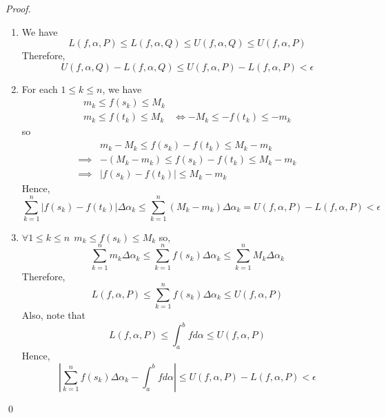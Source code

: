 \begin{proof}
    \begin{enumerate}[($i$)]
        \item We have 
        $$L(f, \alpha, P) \leq L(f, \alpha, Q) \leq U(f, \alpha, Q) \leq U(f, \alpha, P)$$
        Therefore,
        $$U(f, \alpha, Q) - L(f, \alpha, Q) \leq U(f, \alpha, P) - L(f, \alpha, P) < \epsilon$$
        \item For each $1 \leq k \leq n$, we have 
        \begin{align*}
            m_k \leq f(s_k) \leq M_k & \\
            m_k \leq f(t_k) \leq M_k &\iff -M_k \leq -f(t_k) \leq -m_k
        \end{align*}
        so
        \begin{align*}
            &m_k - M_k \leq f(s_k) - f(t_k) \leq M_k - m_k \\
            \implies &-(M_k - m_k) \leq f(s_k) - f(t_k) \leq M_k - m_k \\
            \implies &\left|f(s_k)-f(t_k)\right| \leq M_k - m_k
        \end{align*}
        Hence,
        $$\sum_{k=1}^{n}\left|f(s_k)-f(t_k)\right|\Delta \alpha_k \leq \sum_{k=1}^{n}\left(M_k - m_k\right) \Delta \alpha_k = U(f, \alpha, P) - L(f, \alpha, P) < \epsilon$$

        \item $\forall 1 \leq k \leq n ~~m_k \leq f(s_k) \leq M_k$ so,
        $$\sum_{k=1}^{n}m_k \Delta \alpha_k \leq \sum_{k=1}^{n}f(s_k) \Delta \alpha_k \leq \sum_{k=1}^{n} M_k \Delta \alpha_k$$
        Therefore,
        \begin{equation*}
            L(f, \alpha, P) \leq \sum_{k=1}^{n} f(s_k) \Delta \alpha_k \leq U(f, \alpha, P)
        \end{equation*}
        Also, note that
        \begin{equation*}
            L(f, \alpha, P) \leq \int_{a}^{b}f d\alpha \leq U(f, \alpha, P)
        \end{equation*}
        Hence,
        $$\left|\sum_{k=1}^{n}f(s_k)\Delta \alpha_k - \int_{a}^{b}f d\alpha\right| \leq U(f, \alpha, P) - L(f, \alpha, P) < \epsilon$$
    \end{enumerate}
    \qed
\end{proof}

